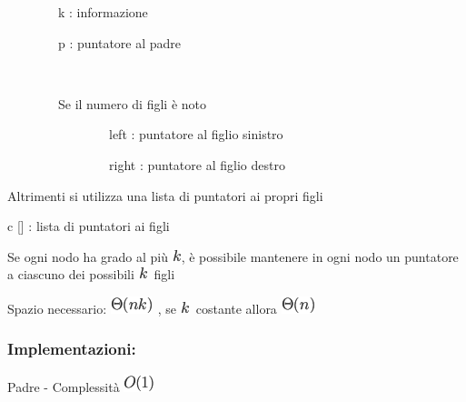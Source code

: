 \documentclass{article}
\begin{document}
{~~~~~~~~k : informazione}

{~~~~~~~~p : puntatore al padre}

{~~~~~~~~}

{~~~~~~~~Se il numero di figli è noto}

{}

{~~~~~~~~~~~~~~~~left : puntatore al figlio sinistro}

{~~~~~~~~~~~~~~~~right : puntatore al figlio destro}

{}

{Altrimenti si utilizza una lista di puntatori ai propri figli}

{}

{c {[}{]} : lista di puntatori ai figli~~~~~~~~}

{}

{Se ogni nodo ha grado al più }\includegraphics{images/image118.png}{, è
possibile mantenere in ogni nodo un puntatore a ciascuno dei possibili
}\includegraphics{images/image118.png}{~figli}

{}

{Spazio necessario: }\includegraphics{images/image119.png}{~, se
}\includegraphics{images/image118.png}{~costante allora
}\includegraphics{images/image120.png}

{}

\hypertarget{h.7iunf1nu58vy}{\subsubsection{\texorpdfstring{{Implementazioni:}}{Implementazioni:}}\label{h.7iunf1nu58vy}}

{Padre - }{Complessità }\includegraphics{images/image121.png}

\protect\hypertarget{t.1fda366af82bd8d3dda4418d0091c3a44b3de824}{}{}\protect\hypertarget{t.9}{}{}
\end{document}
